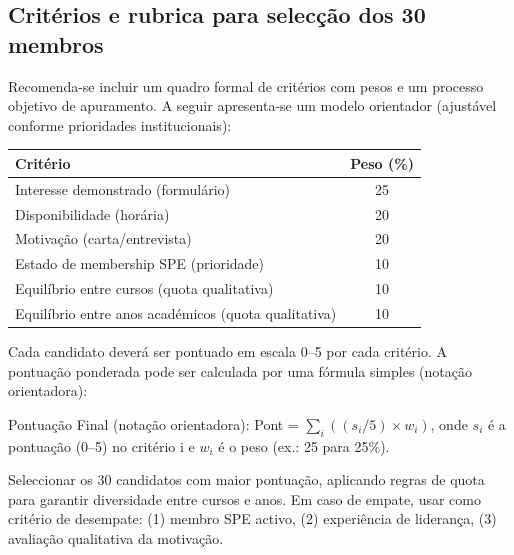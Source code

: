 \documentclass[12pt,a4paper]{article}
\begin{document}
\subsection*{Critérios e rubrica para selecção dos 30 membros}
\noindent Recomenda-se incluir um quadro formal de critérios com pesos e um processo objetivo de apuramento. A seguir apresenta-se um modelo orientador (ajustável conforme prioridades institucionais):
\begin{center}
\begin{tabular}{p{7.5cm}c}
\toprule
Critério & Peso (\%) \\
\midrule
Interesse demonstrado (formulário) & 25 \\
Disponibilidade (horária) & 20 \\
Motivação (carta/entrevista) & 20 \\
Estado de membership SPE (prioridade) & 10 \\
Equilíbrio entre cursos (quota qualitativa) & 10 \\
Equilíbrio entre anos académicos (quota qualitativa) & 10 \\
\bottomrule
\end{tabular}
\end{center}

\noindent Cada candidato deverá ser pontuado em escala 0–5 por cada critério. A pontuação ponderada pode ser calculada por uma fórmula simples (notação orientadora):

\noindent Pontuação Final (notação orientadora): Pont = $\sum_i \left( (s_i/5) \times w_i \right)$, onde $s_i$ é a pontuação (0--5) no critério i e $w_i$ é o peso (ex.: 25 para 25\%).

\noindent Seleccionar os 30 candidatos com maior pontuação, aplicando regras de quota para garantir diversidade entre cursos e anos. Em caso de empate, usar como critério de desempate: (1) membro SPE activo, (2) experiência de liderança, (3) avaliação qualitativa da motivação.
\end{document}
